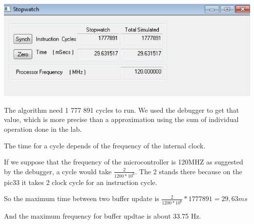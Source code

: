\documentclass[a4paper]{article}
\begin{document}
\begin{center}
\includegraphics[scale=0.5]{files/stopwatch.png} 
\end{center}

The algorithm need 1 777 891 cycles to run. We used the debugger to get that value, which is more precise than a approximation using the sum of individual operation done in the lab.

The time for a cycle depends of the frequency of the internal clock.

If we suppose that the frequency of the microcontroller is 120MHZ as suggested by the debugger, a cycle would take $ \frac{2}{1200 * 10^{6} }$. The 2 stands there because on the pic33 it takes 2 clock cycle for an instruction cycle.

So the maximum time between two buffer update is $ \frac{2}{1200 * 10^{6} } * 1 777 891 =  29,63 ms $

And the maximum frequency for buffer updtae is about 33.75 Hz. 
\end{document}
